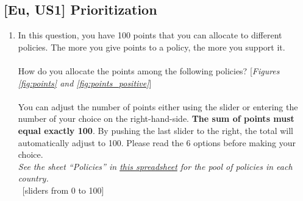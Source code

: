 \subsection*{[Eu, US1] Prioritization}
\begin{enumerate}[resume] \item \label{q:points} In this question, you have 100 points that you can allocate to different policies. The more you give points to a policy, the more you support it.\\ 
   \\
    How do you allocate the points among the following policies? [\textit{Figures \ref{fig:points} and \ref{fig:points_positive}}]  \\
    \\
    You can adjust the number of points either using the slider or entering the number of your choice on the right-hand-side. \textbf{The sum of points must equal exactly 100}. By pushing the last slider to the right, the total will automatically adjust to 100. Please read the 6 options before making your choice.
    \\ \textit{See the sheet ``Policies'' in \href{https://github.com/bixiou/global_tax_attitudes/raw/main/questionnaire/specificities.xlsx}{this spreadsheet} for the pool of policies in each country.}
\\ ~[sliders from 0 to 100]
\end{enumerate}

